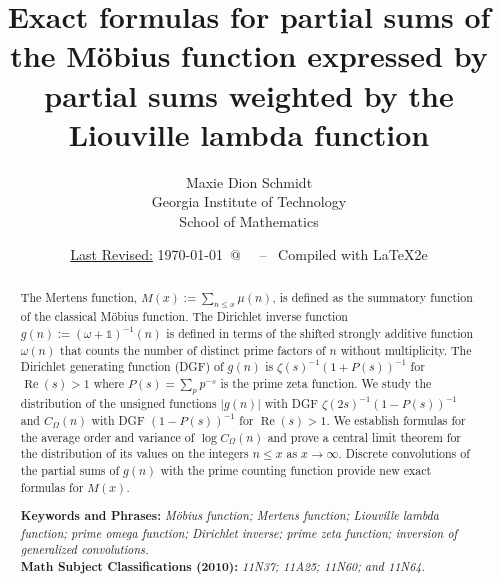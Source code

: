 \documentclass[11pt,reqno,a4letter]{article}
\title{
       Exact formulas for partial sums of the M\"obius function expressed by 
       partial sums weighted by the Liouville lambda function
}
\author{Maxie Dion Schmidt \\
        Georgia Institute of Technology \\
        School of Mathematics
}
\date{\small\underline{Last Revised:} \today \ @\ \hhmmsstime{} \ -- \ Compiled with \LaTeX2e}
\numberwithin{equation}{section}
\numberwithin{figure}{section}
\numberwithin{table}{section}
\theoremstyle{plain}
\numberwithin{theorem}{section}
\theoremstyle{definition}
\theoremstyle{remark}
\renewcommand{\Re}{\operatorname{Re}}
\begin{document}
 

\maketitle

\begin{abstract} 
\noindent  
The Mertens function, $M(x) := \sum_{n \leq x} \mu(n)$, is 
defined as the summatory function of the classical M\"obius function.
The Dirichlet inverse function $g(n) := (\omega+\mathds{1})^{-1}(n)$
is defined in terms of the shifted strongly additive function $\omega(n)$ that counts the 
number of distinct prime factors of $n$ without multiplicity. 
The Dirichlet generating function (DGF) of $g(n)$ is $\zeta(s)^{-1} (1+P(s))^{-1}$ 
for $\Re(s) > 1$ where $P(s) = \sum_p p^{-s}$ is the prime zeta function. 
We study the distribution of the unsigned functions $|g(n)|$ with 
DGF $\zeta(2s)^{-1}(1-P(s))^{-1}$ 
and $C_{\Omega}(n)$ with DGF 
$(1-P(s))^{-1}$ for $\Re(s) > 1$. 
We establish formulas for the average order and variance of 
$\log C_{\Omega}(n)$ and prove a central limit theorem 
for the distribution of its values on the 
integers $n \leq x$ as $x \rightarrow \infty$. 
Discrete convolutions of the partial sums of $g(n)$ with the prime counting function 
provide new exact formulas for $M(x)$. 

\bigskip\noindent
\textbf{Keywords and Phrases:} {\it M\"obius function; Mertens function; 
                                    Liouville lambda function; prime omega function; 
                                    Dirichlet inverse; prime zeta function; 
				                inversion of generalized convolutions. } \\[0.05cm] 
\textbf{Math Subject Classifications (2010):} {\it 11N37; 11A25; 11N60; and 11N64. } 
\end{abstract} 

\end{document}
